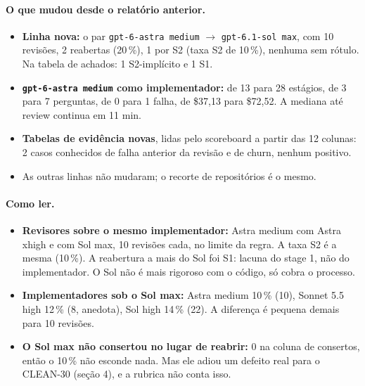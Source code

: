 \documentclass[11pt,a4paper]{article}
\begin{document}
\medskip
{}

\medskip
{}

\paragraph{O que mudou desde o relatório anterior.}
\begin{itemize}
  \item \textbf{Linha nova:} o par \texttt{gpt-6-astra medium} $\to$
        \texttt{gpt-6.1-sol max}, com 10 revisões, 2 reabertas (20\,\%), 1 por
        S2 (taxa S2 de 10\,\%), nenhuma sem rótulo. Na tabela de achados: 1
        S2-implícito e 1 S1.
  \item \textbf{\texttt{gpt-6-astra medium} como implementador:} de 13 para
        28 estágios, de 3 para 7 perguntas, de 0 para 1 falha, de \$37,13 para
        \$72,52. A mediana até review continua em 11 min.
  \item \textbf{Tabelas de evidência novas}, lidas pelo scoreboard a partir das
        12 colunas: 2 casos conhecidos de falha anterior da revisão e de churn,
        nenhum positivo.
  \item As outras linhas não mudaram; o recorte de repositórios é o mesmo.
\end{itemize}

\paragraph{Como ler.}
\begin{itemize}
  \item \textbf{Revisores sobre o mesmo implementador:} Astra medium com Astra
        xhigh e com Sol max, 10 revisões cada, no limite da regra. A taxa S2 é
        a mesma (10\,\%). A reabertura a mais do Sol foi S1: lacuna do stage 1,
        não do implementador. O Sol não é mais rigoroso com o código, só
        cobra o processo.
  \item \textbf{Implementadores sob o Sol max:} Astra medium 10\,\% (10),
        Sonnet 5.5 high 12\,\% (8, anedota), Sol high 14\,\% (22). A diferença
        é pequena demais para 10 revisões.
  \item \textbf{O Sol max não consertou no lugar de reabrir:} 0 na coluna de
        consertos, então o 10\,\% não esconde nada. Mas ele adiou um defeito
        real para o CLEAN-30 (seção 4), e a rubrica não conta isso.
\end{itemize}
\end{document}
